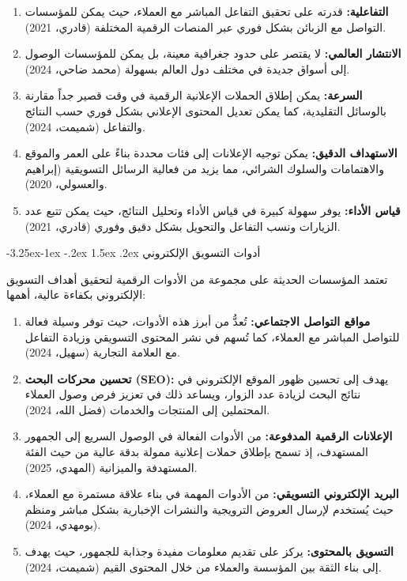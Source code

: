 \documentclass[12pt, a4paper]{report}
\makeatletter
\newcommand{\lr}[1]{\textenglish{#1}}
\renewcommand\subsection{\@startsection{subsection}{2}{\z@}%
  {-3.25ex\@plus -1ex \@minus -.2ex}%
  {1.5ex \@plus .2ex}%
  {\normalfont\large\bfseries\color{sectiongray}}}
\makeatother
\begin{document}
\begin{enumerate}[label=\arabic*.]
  \item \textbf{التفاعلية:} قدرته على تحقيق التفاعل المباشر مع العملاء، حيث يمكن للمؤسسات التواصل مع الزبائن بشكل فوري عبر المنصات الرقمية المختلفة (قادري، 2021).
  \item \textbf{الانتشار العالمي:} لا يقتصر على حدود جغرافية معينة، بل يمكن للمؤسسات الوصول إلى أسواق جديدة في مختلف دول العالم بسهولة (محمد ضاحي، 2024).
  \item \textbf{السرعة:} يمكن إطلاق الحملات الإعلانية الرقمية في وقت قصير جداً مقارنة بالوسائل التقليدية، كما يمكن تعديل المحتوى الإعلاني بشكل فوري حسب النتائج والتفاعل (شميمت، 2024).
  \item \textbf{الاستهداف الدقيق:} يمكن توجيه الإعلانات إلى فئات محددة بناءً على العمر والموقع والاهتمامات والسلوك الشرائي، مما يزيد من فعالية الرسائل التسويقية (إبراهيم والعسولي، 2020).
  \item \textbf{قياس الأداء:} يوفر سهولة كبيرة في قياس الأداء وتحليل النتائج، حيث يمكن تتبع عدد الزيارات ونسب التفاعل والتحويل بشكل دقيق وفوري (قادري، 2021).
\end{enumerate}

\subsection{أدوات التسويق الإلكتروني}

تعتمد المؤسسات الحديثة على مجموعة من الأدوات الرقمية لتحقيق أهداف التسويق الإلكتروني بكفاءة عالية، أهمها:

\begin{enumerate}[label=\arabic*.]
  \item \textbf{مواقع التواصل الاجتماعي:} تُعدُّ من أبرز هذه الأدوات، حيث توفر وسيلة فعالة للتواصل المباشر مع العملاء، كما تُسهم في نشر المحتوى التسويقي وزيادة التفاعل مع العلامة التجارية (سهيل، 2024).
  \item \textbf{تحسين محركات البحث \lr{(SEO)}:} يهدف إلى تحسين ظهور الموقع الإلكتروني في نتائج البحث لزيادة عدد الزوار، ويساعد ذلك في تعزيز فرص وصول العملاء المحتملين إلى المنتجات والخدمات (فضل الله، 2024).
  \item \textbf{الإعلانات الرقمية المدفوعة:} من الأدوات الفعالة في الوصول السريع إلى الجمهور المستهدف، إذ تسمح بإطلاق حملات إعلانية ممولة بدقة عالية من حيث الفئة المستهدفة والميزانية (المهدي، 2025).
  \item \textbf{البريد الإلكتروني التسويقي:} من الأدوات المهمة في بناء علاقة مستمرة مع العملاء، حيث يُستخدم لإرسال العروض الترويجية والنشرات الإخبارية بشكل مباشر ومنظم (بومهدي، 2024).
  \item \textbf{التسويق بالمحتوى:} يركز على تقديم معلومات مفيدة وجذابة للجمهور، حيث يهدف إلى بناء الثقة بين المؤسسة والعملاء من خلال المحتوى القيم (شميمت، 2024).
\end{enumerate}
\end{document}
